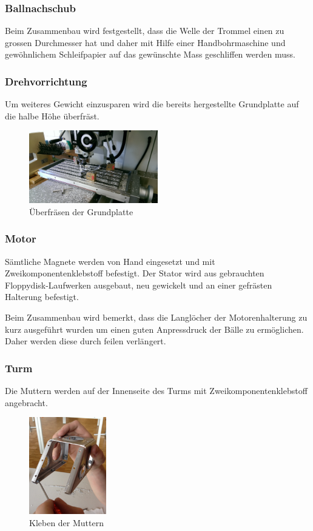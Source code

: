 \subsubsection{Ballnachschub}
Beim Zusammenbau wird festgestellt, dass die Welle der Trommel einen zu 
grossen Durchmesser hat und daher mit Hilfe einer Handbohrmaschine und 
gewöhnlichem Schleifpapier auf das gewünschte Mass geschliffen werden muss.

\subsubsection{Drehvorrichtung}
Um weiteres Gewicht einzusparen wird die bereits hergestellte Grundplatte auf 
die halbe Höhe überfräst.

\begin{figure}[h!]          
	\centering             
	\includegraphics[width=0.5\textwidth]{fig/IMAG0357.jpg}
	\caption{Überfräsen der Grundplatte}
	\label{fig:Grundplatte fräsen}        
\end{figure}

\subsubsection{Motor}
Sämtliche Magnete werden von Hand eingesetzt und mit Zweikomponentenklebstoff 
befestigt. Der Stator wird aus gebrauchten Floppydisk-Laufwerken ausgebaut, 
neu gewickelt und an einer gefrästen Halterung befestigt.

Beim Zusammenbau wird bemerkt, dass die Langlöcher der Motorenhalterung zu 
kurz ausgeführt wurden um einen guten Anpressdruck der Bälle zu ermöglichen. 
Daher werden diese durch feilen verlängert.

\subsubsection{Turm}
Die Muttern werden auf der Innenseite des Turms mit Zweikomponentenklebstoff 
angebracht.

\begin{figure}[h!]          
	\centering             
	\includegraphics[width=0.3\textwidth]{fig/IMG_2292.JPG}
	\caption{Kleben der Muttern}
	\label{fig:Muttern Kleben}        
\end{figure}


